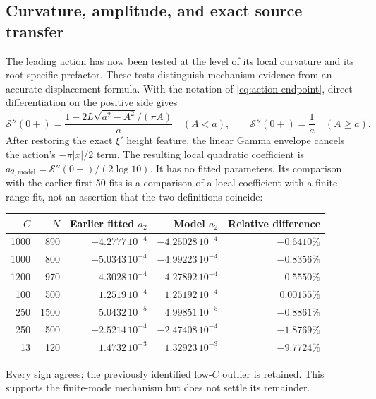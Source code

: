 \subsection{Curvature, amplitude, and exact source transfer}
\label{sec:action-prefactor}

The leading action has now been tested at the level of its local
curvature and its root-specific prefactor. These tests distinguish
mechanism evidence from an accurate displacement formula.
With the notation of \eqref{eq:action-endpoint}, direct differentiation
on the positive side gives
\[
 \mathcal S''(0+)=\frac{1-2L\sqrt{a^2-A^2}/(\pi A)}{a}
 \quad(A<a),\qquad \mathcal S''(0+)=\frac1a\quad(A\geq a).
\]
After restoring the exact $\xi'$ height feature, the linear Gamma
envelope cancels the action's $-\pi|x|/2$ term. The resulting local
quadratic coefficient is $a_{2,\mathrm{model}}=\mathcal S''(0+)/(2\log10)$.
It has no fitted parameters. Its comparison with the earlier first-50
fits is a comparison of a local coefficient with a finite-range fit,
not an assertion that the two definitions coincide:
\begin{center}\small
\begin{tabular}{rr|rrr}
\toprule
$C$&$N$&Earlier fitted $a_2$&Model $a_2$&Relative difference\\
\midrule
1000&890 &$-4.2777\,10^{-4}$&$-4.25028\,10^{-4}$&$-0.6410\%$\\
1000&800 &$-5.0343\,10^{-4}$&$-4.99223\,10^{-4}$&$-0.8356\%$\\
1200&970 &$-4.3028\,10^{-4}$&$-4.27892\,10^{-4}$&$-0.5550\%$\\
100&500  &$ 1.2519\,10^{-4}$&$ 1.25192\,10^{-4}$&$ 0.00155\%$\\
250&1500 &$ 5.0432\,10^{-5}$&$ 4.99851\,10^{-5}$&$-0.8861\%$\\
250&500  &$-2.5214\,10^{-4}$&$-2.47408\,10^{-4}$&$-1.8769\%$\\
13&120   &$ 1.4732\,10^{-3}$&$ 1.32923\,10^{-3}$&$-9.7724\%$\\
\bottomrule
\end{tabular}
\end{center}
Every sign agrees; the previously identified low-$C$ outlier is retained.
This supports the finite-mode mechanism but does not settle its remainder.

